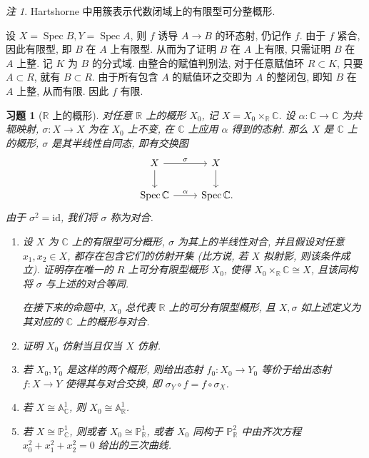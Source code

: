 \documentclass{article}
\theoremstyle{exercise}
\newtheorem{exercise}{习题}[section]
\theoremstyle{plain}
\theoremstyle{remark}
\newtheorem*{remark*}{注}
\newenvironment{proofc}{\proof}{\endproof}
\def\A{\mathbb{A}}
\def\P{\mathbb{P}}
\def\R{\mathbb{R}}
\def\C{\mathbb{C}}
\def\id{\mathrm{id}}
\def\Spec{\operatorname{Spec}}
\begin{document}
\begin{remark*}
  Hartshorne 中用簇表示代数闭域上的有限型可分整概形.
\end{remark*}

\begin{proofc}
  设 $X = \Spec B, Y = \Spec A$, 则 $f$ 诱导 $A \to B$ 的环态射, 仍记作 $f$.
  由于 $f$ 紧合, 因此有限型, 即 $B$ 在 $A$ 上有限型.
  从而为了证明 $B$ 在 $A$ 上有限, 只需证明 $B$ 在 $A$ 上整.
  记 $K$ 为 $B$ 的分式域.
  由整合的赋值判别法, 对于任意赋值环 $R \subset K$, 只要 $A \subset R$,
  就有 $B \subset R$.
  由于所有包含 $A$ 的赋值环之交即为 $A$ 的整闭包, 即知 $B$ 在 $A$ 上整, 从而有限.
  因此 $f$ 有限.
\end{proofc}

\begin{exercise}[$\R$ 上的概形]
  对任意 $\R$ 上的概形 $X_0$, 记 $X = X_0 \times_{\R} \C$.
  设 $\alpha \colon \C \to \C$ 为共轭映射,
  $\sigma \colon X \to X$ 为在 $X_0$ 上不变, 在 $\C$ 上应用 $\alpha$ 得到的态射.
  那么 $X$ 是 $\C$ 上的概形, $\sigma$ 是其\emph{半线性}自同态, 即有交换图
  \[\begin{tikzcd}
      X \ar[d] \ar[r, "\sigma"] & X \ar[d] \\
      \Spec \C \ar[r, "\alpha"] & \Spec \C\rlap{.}
    \end{tikzcd}\]
  由于 $\sigma^2 = \id$, 我们将 $\sigma$ 称为\emph{对合}.
  \begin{enumerate}[label=(\alph*)]
    \item 设 $X$ 为 $\C$ 上的有限型可分概形, $\sigma$ 为其上的半线性对合,
          并且假设对任意 $x_1, x_2 \in X$, 都存在包含它们的仿射开集
          (比方说, 若 $X$ 拟射影, 则该条件成立).
          证明存在唯一的 $R$ 上可分有限型概形 $X_0$, 使得 $X_0 \times_{\R} \C \cong X$,
          且该同构将 $\sigma$ 与上述的对合等同.

          在接下来的命题中, $X_0$ 总代表 $\R$ 上的可分有限型概形,
          且 $X, \sigma$ 如上述定义为其对应的 $\C$ 上的概形与对合.
    \item 证明 $X_0$ 仿射当且仅当 $X$ 仿射.
    \item 若 $X_0, Y_0$ 是这样的两个概形, 则给出态射 $f_0 \colon X_0 \to Y_0$
          等价于给出态射 $f \colon X \to Y$ 使得其与对合交换,
          即 $\sigma_Y \circ f = f \circ \sigma_X$.
    \item 若 $X \cong \A_{\C}^1$, 则 $X_0 \cong \A_{\R}^1$.
    \item 若 $X \cong \P_{\C}^1$, 则或者 $X_0 \cong \P_{\R}^1$,
          或者 $X_0$ 同构于 $\P_{\R}^2$ 中由齐次方程 $x_0^2 + x_1^2 + x_2^2 = 0$ 给出的三次曲线.
  \end{enumerate}
\end{exercise}
\end{document}
